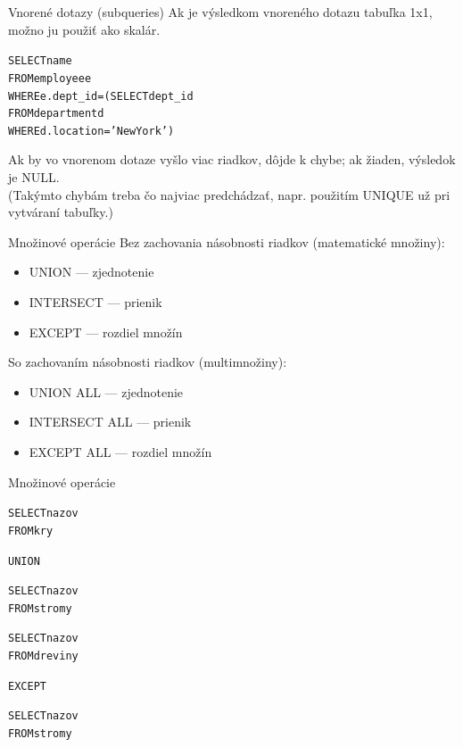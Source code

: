 \documentclass[12pt]{beamer}
\def\blue#1{\textcolor{Cerulean}{#1}}
\begin{document}
\begin{frame}[fragile]{Vnorené dotazy (subqueries)}
Ak je výsledkom vnoreného dotazu tabuľka 1x1, možno ju použiť ako skalár.
\begin{alltt}
SELECT name
FROM employee e
WHERE \alert{e.dept_id =} \blue{(SELECT dept_id
                  FROM department d
                  WHERE d.location = 'New York')}
\end{alltt}
Ak by vo vnorenom dotaze vyšlo viac riadkov, dôjde k chybe; ak žiaden, výsledok je NULL.\\
(Takýmto chybám treba čo najviac predchádzať, napr. použitím UNIQUE už pri vytváraní tabuľky.)
\end{frame}

\begin{frame}{Množinové operácie}
Bez zachovania násobnosti riadkov (matematické množiny):
\begin{itemize}
\item UNION --- zjednotenie
\item INTERSECT --- prienik
\item EXCEPT --- rozdiel množín
\end{itemize}
So zachovaním násobnosti riadkov (multimnožiny):
\begin{itemize}
\item UNION ALL --- zjednotenie
\item INTERSECT ALL --- prienik
\item EXCEPT ALL --- rozdiel množín
\end{itemize}
\end{frame}

\begin{frame}[fragile]{Množinové operácie}
\begin{minipage}{.4\pdfpagewidth}
\begin{alltt}
SELECT nazov
FROM kry

\alert{UNION}

SELECT nazov
FROM stromy
\end{alltt}
\end{minipage}
\begin{minipage}{.4\pdfpagewidth}
\begin{alltt}
SELECT nazov
FROM dreviny

\alert{EXCEPT}

SELECT nazov
FROM stromy
\end{alltt}
\end{minipage}
\end{frame}
\end{document}
